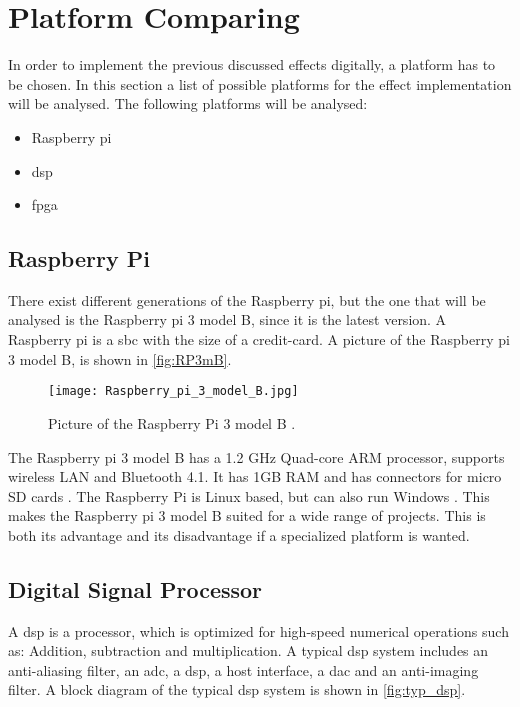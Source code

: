 \section{Platform Comparing}
In order to implement the previous discussed effects digitally, a platform has to be chosen. In this section a list of possible platforms for the effect implementation will be analysed. The following platforms will be analysed:

\begin{itemize}
\item Raspberry pi
\item \gls{dsp}
\item \gls{fpga}
\end{itemize}

\subsection{Raspberry Pi}
There exist different generations of the Raspberry pi, but the one that will be analysed is the Raspberry pi 3 model B, since it is the latest version. 
A Raspberry pi is a \gls{sbc} with the size of a credit-card. A picture of the Raspberry pi 3 model B, is shown in \autoref{fig:RP3mB}.

\begin{figure}[h]
	\centering
		\texttt{[image: Raspberry\_pi\_3\_model\_B.jpg]}
		\caption{Picture of the Raspberry Pi 3 model B \citep{Raspberry_pi}.}
		\label{fig:RP3mB}
\end{figure}

The Raspberry pi 3 model B has a 1.2 GHz Quad-core ARM processor, supports wireless LAN and Bluetooth 4.1. It has 1GB RAM and has connectors for micro SD cards \citep{Raspberry_pi}.
The Raspberry Pi is Linux based, but can also run Windows \citep{sparkfun_Raspberry_pi}. This makes the Raspberry pi 3 model B suited for a wide range of projects. This is both its advantage and its disadvantage if a specialized platform is wanted. 

\subsection{Digital Signal Processor}
A \gls{dsp} is a processor, which is optimized for high-speed numerical operations such as: Addition, subtraction and multiplication. A typical \gls{dsp} system includes an anti-aliasing filter, an \gls{adc}, a \gls{dsp}, a host interface, a \gls{dac} and an anti-imaging filter. A block diagram of the typical \gls{dsp} system is shown in \autoref{fig:typ_dsp}.

